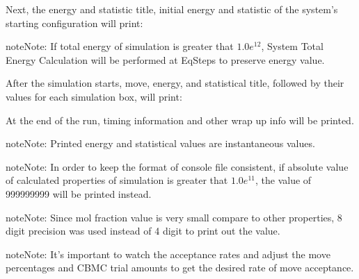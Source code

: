 \documentclass[letterpaper,10pt,english]{sphinxmanual}
\begin{document}
\noindent{}

\noindent{}

\noindent{}

Next, the energy and statistic title, initial energy and statistic of the system’s starting configuration will print:

\begin{sphinxadmonition}{note}{Note:}
If total energy of simulation is greater that \(1.0e^{12}\), System Total Energy Calculation will be performed at EqSteps to preserve energy value.
\end{sphinxadmonition}

\noindent{}

After the simulation starts, move, energy, and statistical title, followed by their values for each simulation box, will print:

\noindent{}

At the end of the run, timing information and other wrap up info will be printed.

\begin{sphinxadmonition}{note}{Note:}
Printed energy and statistical values are instantaneous values.
\end{sphinxadmonition}

\begin{sphinxadmonition}{note}{Note:}
In order to keep the format of console file consistent, if absolute value of calculated properties of simulation is greater that \(1.0e^{11}\), the value of 999999999 will be printed instead.
\end{sphinxadmonition}

\begin{sphinxadmonition}{note}{Note:}
Since mol fraction value is very small compare to other properties, 8 digit precision was used instead of 4 digit to print out the value.
\end{sphinxadmonition}

\begin{sphinxadmonition}{note}{Note:}
It’s important to watch the acceptance rates and adjust the move percentages and CBMC trial amounts to get the desired rate of move acceptance.
\end{sphinxadmonition}
\end{document}
